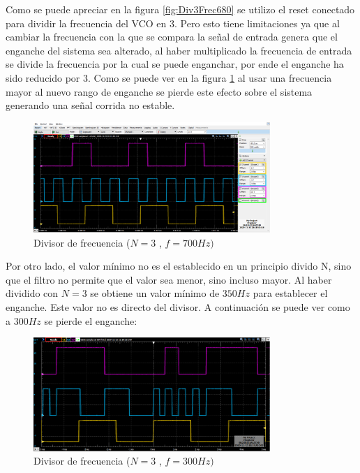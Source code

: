 Como se puede apreciar en la figura \ref{fig:Div3Frec680} se utilizo el reset conectado para dividir la frecuencia del VCO en 3. Pero esto tiene limitaciones ya que al cambiar la frecuencia con la que se compara la señal de entrada genera que el enganche del sistema sea alterado, al haber multiplicado la frecuencia de entrada se divide la frecuencia por la cual se puede enganchar, por ende el enganche ha sido reducido por 3. Como se puede ver en la figura \ref{fig:Div3Frec700} al usar una frecuencia mayor al nuevo rango de enganche se pierde este efecto sobre el sistema generando una señal corrida no estable.


\begin{figure}[H]
	\includegraphics[width= 0.8\textwidth]{../1. PLL/Imagenes/DIV3f700.png}
	\centering
	\caption{Divisor de frecuencia ($N=3$ , $f=700Hz)$}
	\label{fig:Div3Frec700}
\end{figure}

Por otro lado, el valor mínimo no es el establecido en un principio divido N, sino que el filtro no permite que el valor sea menor, sino incluso mayor. Al haber dividido con $N=3$ se obtiene un valor mínimo de $350Hz$ para establecer el enganche. Este valor no es directo del divisor. A continuación se puede ver como a $300Hz$ se pierde el enganche:

\begin{figure}[H]
	\includegraphics[width= 0.8\textwidth]{../1. PLL/Imagenes/DIV3f300.png}
	\centering
	\caption{Divisor de frecuencia ($N=3$ , $f=300Hz)$}
	\label{fig:Div3Frec300}
\end{figure}

